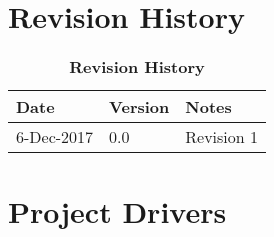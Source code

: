 \documentclass[12pt, titlepage]{article}
\newcommand{\revisionTable}{
	\begin{table}[hp]
		
		\begin{tabularx}{\textwidth}{p{3cm}p{2cm}X}
			\toprule {\bf Date} & {\bf Version} & {\bf Notes}\\
			\midrule
			
			6-Dec-2017 & 0.0 & Revision 1\\
			
			\bottomrule
		\end{tabularx}
	\caption{\bf Revision History}
	\end{table}
}
\begin{document}
	
	
	
	
	
	
	\def\thesection{\arabic{section}} 
	\renewcommand\thesection{\arabic{section}} 
	\renewcommand\thesubsection{\thesection.\arabic{subsection}}
	
	\tableofcontents
	
	\listoftables
	
	\listoffigures
	
	
	\newpage
	
	\section{Revision History}
	\revisionTable

	
	\section{Project Drivers}
\newcommand{\labelWidth}{55pt}
\newcommand{\descWidth}{5.13in}

	\newcommand{\pbox}[1]{\parbox[t]{\descWidth}{#1}}

	\newcommand{\labelbox}[1]{\parbox[t]{\labelWidth}{\textit{#1}}}
	\newcommand{\myline}{%
		\kern1pt %
		\hrule height 0.8pt
		\kern3pt %
	}


\newcommand\Tstrut{\rule{0pt}{0.5ex}}         %
\newcommand\Bstrut{\rule[-0.9ex]{0pt}{0pt}}   %
\end{document}
